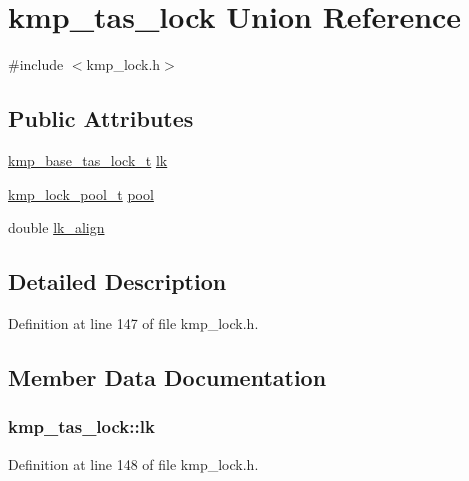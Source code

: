 \hypertarget{unionkmp__tas__lock}{\section{kmp\-\_\-tas\-\_\-lock Union Reference}
\label{unionkmp__tas__lock}
}


{\ttfamily \#include $<$kmp\-\_\-lock.\-h$>$}

\subsection*{Public Attributes}
\begin{DoxyCompactItemize}
\item 
\hyperlink{kmp__lock_8h_a08465aaad52d67f8ae556e7fccaa8c48}{kmp\-\_\-base\-\_\-tas\-\_\-lock\-\_\-t} \hyperlink{unionkmp__tas__lock_ad51358485337a210e18f4ea9cbe6477a}{lk}
\item 
\hyperlink{kmp__lock_8h_a467f5477f4f5397ebd24a94c85922744}{kmp\-\_\-lock\-\_\-pool\-\_\-t} \hyperlink{unionkmp__tas__lock_aada78443b49259e3da7eb792931a7d27}{pool}
\item 
double \hyperlink{unionkmp__tas__lock_af85f01205b1098bb84f3dce7b038559b}{lk\-\_\-align}
\end{DoxyCompactItemize}


\subsection{Detailed Description}


Definition at line 147 of file kmp\-\_\-lock.\-h.



\subsection{Member Data Documentation}
\hypertarget{unionkmp__tas__lock_ad51358485337a210e18f4ea9cbe6477a}{
\subsubsection[{lk}]{ kmp\-\_\-tas\-\_\-lock\-::lk}}\label{unionkmp__tas__lock_ad51358485337a210e18f4ea9cbe6477a}


Definition at line 148 of file kmp\-\_\-lock.\-h.



